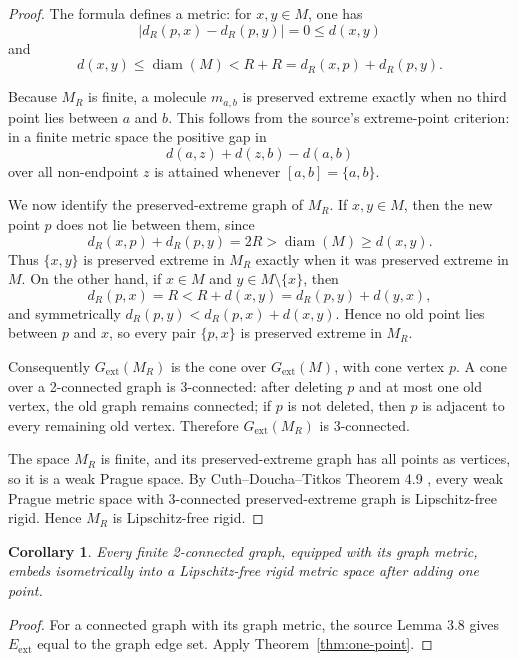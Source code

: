 \documentclass[11pt]{article}
\newtheorem{corollary}{Corollary}
\newcommand{\diam}{\operatorname{diam}}
\begin{document}
\begin{proof}
The formula defines a metric: for \(x,y\in M\), one has
\[
  |d_R(p,x)-d_R(p,y)|=0\le d(x,y)
\]
and
\[
  d(x,y)\le \diam(M)<R+R=d_R(x,p)+d_R(p,y).
\]

Because \(M_R\) is finite, a molecule \(m_{a,b}\) is preserved extreme exactly when no third point lies between \(a\) and \(b\).  This follows from the source's extreme-point criterion: in a finite metric space the positive gap in
\[
  d(a,z)+d(z,b)-d(a,b)
\]
over all non-endpoint \(z\) is attained whenever \([a,b]=\{a,b\}\).

We now identify the preserved-extreme graph of \(M_R\).  If \(x,y\in M\), then the new point \(p\) does not lie between them, since
\[
  d_R(x,p)+d_R(p,y)=2R>\diam(M)\ge d(x,y).
\]
Thus \(\{x,y\}\) is preserved extreme in \(M_R\) exactly when it was preserved extreme in \(M\).  On the other hand, if \(x\in M\) and \(y\in M\setminus\{x\}\), then
\[
  d_R(p,x)=R<R+d(x,y)=d_R(p,y)+d(y,x),
\]
and symmetrically \(d_R(p,y)<d_R(p,x)+d(x,y)\).  Hence no old point lies between \(p\) and \(x\), so every pair \(\{p,x\}\) is preserved extreme in \(M_R\).

Consequently \(G_{\mathrm{ext}}(M_R)\) is the cone over \(G_{\mathrm{ext}}(M)\), with cone vertex \(p\).  A cone over a 2-connected graph is 3-connected: after deleting \(p\) and at most one old vertex, the old graph remains connected; if \(p\) is not deleted, then \(p\) is adjacent to every remaining old vertex.  Therefore \(G_{\mathrm{ext}}(M_R)\) is 3-connected.

The space \(M_R\) is finite, and its preserved-extreme graph has all points as vertices, so it is a weak Prague space.  By Cuth--Doucha--Titkos Theorem 4.9 \cite{CDT}, every weak Prague metric space with 3-connected preserved-extreme graph is Lipschitz-free rigid.  Hence \(M_R\) is Lipschitz-free rigid.
\end{proof}

\begin{corollary}
Every finite 2-connected graph, equipped with its graph metric, embeds isometrically into a Lipschitz-free rigid metric space after adding one point.
\end{corollary}

\begin{proof}
For a connected graph with its graph metric, the source Lemma 3.8 gives \(E_{\mathrm{ext}}\) equal to the graph edge set.  Apply Theorem~\ref{thm:one-point}.
\end{proof}
\end{document}
